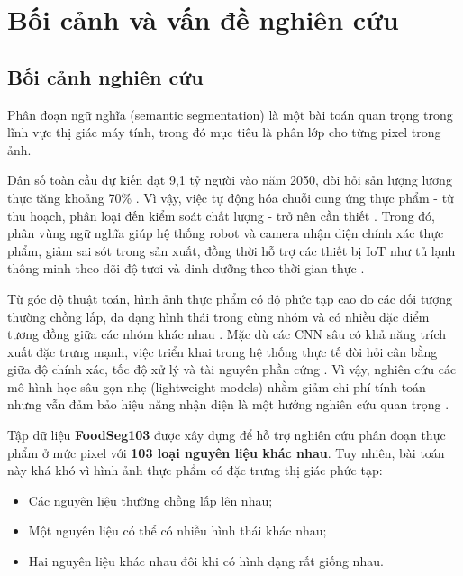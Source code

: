 \section{Bối cảnh và vấn đề nghiên cứu}
\label{introduction}

\subsection{Bối cảnh nghiên cứu}

Phân đoạn ngữ nghĩa (semantic segmentation) là một bài toán quan trọng trong lĩnh vực thị giác máy tính, trong đó mục tiêu là phân lớp cho từng pixel trong ảnh. 

Dân số toàn cầu dự kiến đạt 9,1 tỷ người vào năm 2050, đòi hỏi sản lượng lương thực tăng khoảng 70\% \parencite{godfray2010foodsecurity,alexandratos1995world}. Vì vậy, việc tự động hóa chuỗi cung ứng thực phẩm - từ thu hoạch, phân loại đến kiểm soát chất lượng - trở nên cần thiết \parencite{mahalik2010trends,stemmer2018vision}. Trong đó, phân vùng ngữ nghĩa giúp hệ thống robot và camera nhận diện chính xác thực phẩm, giảm sai sót trong sản xuất, đồng thời hỗ trợ các thiết bị IoT như tủ lạnh thông minh theo dõi độ tươi và dinh dưỡng theo thời gian thực \parencite{gao2019smartfridge,wang2019smartrefrigerator}.

Từ góc độ thuật toán, hình ảnh thực phẩm có độ phức tạp cao do các đối tượng thường chồng lấp, đa dạng hình thái trong cùng nhóm và có nhiều đặc điểm tương đồng giữa các nhóm khác nhau \parencite{zhuang2020transfer}. Mặc dù các CNN sâu có khả năng trích xuất đặc trưng mạnh, việc triển khai trong hệ thống thực tế đòi hỏi cân bằng giữa độ chính xác, tốc độ xử lý và tài nguyên phần cứng \parencite{he2015residual}. Vì vậy, nghiên cứu các mô hình học sâu gọn nhẹ (lightweight models) nhằm giảm chi phí tính toán nhưng vẫn đảm bảo hiệu năng nhận diện là một hướng nghiên cứu quan trọng \parencite{dong2020mobilenetv2}.

Tập dữ liệu \textbf{FoodSeg103} được xây dựng để hỗ trợ nghiên cứu phân đoạn thực phẩm ở mức pixel với \textbf{103 loại nguyên liệu khác nhau}. Tuy nhiên, bài toán này khá khó vì hình ảnh thực phẩm có đặc trưng thị giác phức tạp:
\begin{itemize}
    \item Các nguyên liệu thường chồng lấp lên nhau;
    \item Một nguyên liệu có thể có nhiều hình thái khác nhau;
    \item Hai nguyên liệu khác nhau đôi khi có hình dạng rất giống nhau.
\end{itemize}

